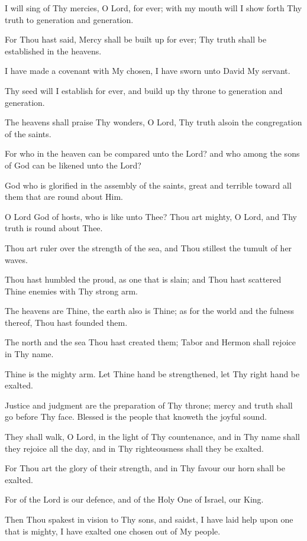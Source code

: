 I will sing of Thy mercies, O Lord, for ever; with my mouth will I show forth Thy truth to generation and generation.

For Thou hast said, Mercy shall be built up for ever; Thy truth shall be established in the heavens.

I have made a covenant with My chosen, I have sworn unto David My servant.

Thy seed will I establish for ever, and build up thy throne to generation and generation.

The heavens shall praise Thy wonders, O Lord, Thy truth alsoin the congregation of the saints.

For who in the heaven can be compared unto the Lord? and who among the sons of God can be likened unto the Lord?

God who is glorified in the assembly of the saints, great and terrible toward all them that are round about Him.

O Lord God of hosts, who is like unto Thee? Thou art mighty, O Lord, and Thy truth is round about Thee.

Thou art ruler over the strength of the sea, and Thou stillest the tumult of her waves.

Thou hast humbled the proud, as one that is slain; and Thou hast scattered Thine enemies with Thy strong arm.

The heavens are Thine, the earth also is Thine; as for the world and the fulness thereof, Thou hast founded them.

The north and the sea Thou hast created them; Tabor and Hermon shall rejoice in Thy name.

Thine is the mighty arm. Let Thine hand be strengthened, let Thy right hand be exalted.

Justice and judgment are the preparation of Thy throne; mercy and truth shall go before Thy face. Blessed is the people that knoweth the joyful sound.

They shall walk, O Lord, in the light of Thy countenance, and in Thy name shall they rejoice all the day, and in Thy righteousness shall they be exalted.

For Thou art the glory of their strength, and in Thy favour our horn shall be exalted.

For of the Lord is our defence, and of the Holy One of Israel, our King.

Then Thou spakest in vision to Thy sons, and saidst, I have laid help upon one that is mighty, I have exalted one chosen out of My people.

